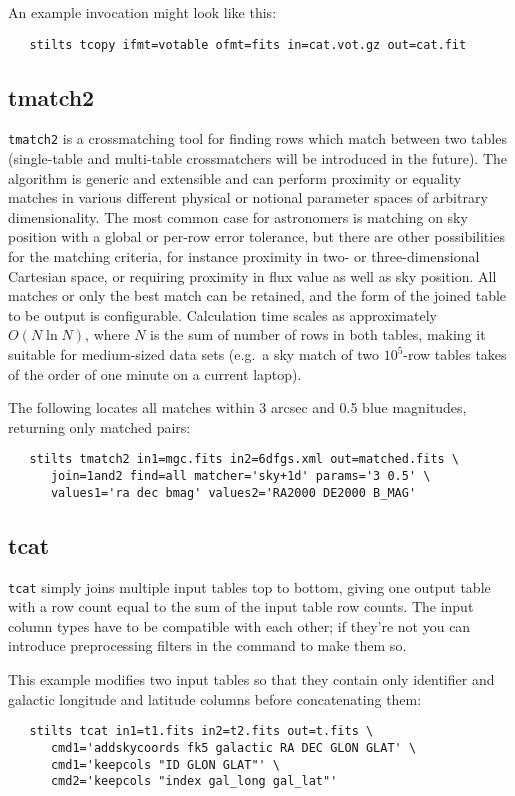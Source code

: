 \documentclass[11pt,twoside]{article}  %
\begin{document}
An example invocation might look like this:
\begin{verbatim}
   stilts tcopy ifmt=votable ofmt=fits in=cat.vot.gz out=cat.fit 
\end{verbatim}


\subsection{tmatch2}

{\tt tmatch2} is a crossmatching tool for finding rows which match
between two tables
(single-table and multi-table crossmatchers will be introduced 
in the future).
The algorithm is generic and extensible 
and can perform proximity or equality 
matches in various different physical or notional parameter spaces
of arbitrary dimensionality.  The most common case for astronomers 
is matching on sky position with a global or per-row error tolerance,
but there are other possibilities for the matching criteria,
for instance proximity in two- or three-dimensional Cartesian space,
or requiring proximity in flux value as well as sky position.
All matches or only the best match can be retained, and the
form of the joined table to be output is configurable.
Calculation time scales as approximately $O(N \ln N)$, where $N$ is
the sum of number of rows in both tables, making it
suitable for medium-sized data sets
(e.g.\ a sky match of two $10^5$-row tables takes of the order of one
minute on a current laptop).

The following locates all matches within 3 arcsec and 0.5 blue
magnitudes, returning only matched pairs:
\begin{verbatim}
   stilts tmatch2 in1=mgc.fits in2=6dfgs.xml out=matched.fits \
      join=1and2 find=all matcher='sky+1d' params='3 0.5' \
      values1='ra dec bmag' values2='RA2000 DE2000 B_MAG' 
\end{verbatim}

\subsection{tcat}

{\tt tcat} simply joins multiple input tables top to bottom, giving
one output table with a row count equal to the sum of the input table
row counts.
The input column types have to be compatible with each other;
if they're not you can introduce preprocessing 
filters in the command to make them so.

This example modifies two input tables so that they contain only 
identifier and galactic longitude and latitude columns 
before concatenating them:
\begin{verbatim}
   stilts tcat in1=t1.fits in2=t2.fits out=t.fits \
      cmd1='addskycoords fk5 galactic RA DEC GLON GLAT' \
      cmd1='keepcols "ID GLON GLAT"' \
      cmd2='keepcols "index gal_long gal_lat"'
\end{verbatim}
\end{document}
